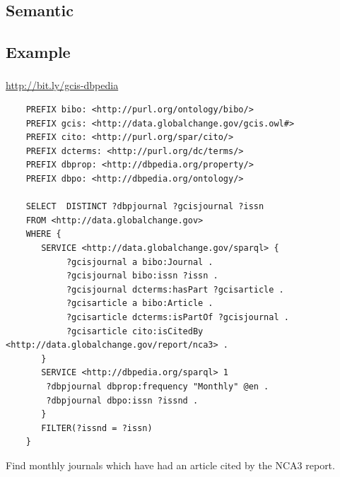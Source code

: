 \documentclass{beamer}
\begin{document}
\subsection{Semantic}

\subsection{Example}
\begin{frame}[fragile]
    \frametitle{\insertsubsectionhead}
     \url{http://bit.ly/gcis-dbpedia}\\
\begin{tiny}
\begin{Verbatim}
    PREFIX bibo: <http://purl.org/ontology/bibo/>
    PREFIX gcis: <http://data.globalchange.gov/gcis.owl#>
    PREFIX cito: <http://purl.org/spar/cito/>
    PREFIX dcterms: <http://purl.org/dc/terms/>
    PREFIX dbprop: <http://dbpedia.org/property/>
    PREFIX dbpo: <http://dbpedia.org/ontology/>

    SELECT  DISTINCT ?dbpjournal ?gcisjournal ?issn
    FROM <http://data.globalchange.gov>
    WHERE {
       SERVICE <http://data.globalchange.gov/sparql> {
            ?gcisjournal a bibo:Journal .
            ?gcisjournal bibo:issn ?issn .
            ?gcisjournal dcterms:hasPart ?gcisarticle .
            ?gcisarticle a bibo:Article .
            ?gcisarticle dcterms:isPartOf ?gcisjournal .
            ?gcisarticle cito:isCitedBy <http://data.globalchange.gov/report/nca3> .
       }
       SERVICE <http://dbpedia.org/sparql> 1
        ?dbpjournal dbprop:frequency "Monthly" @en .
        ?dbpjournal dbpo:issn ?issnd .
       }
       FILTER(?issnd = ?issn)
    }
\end{Verbatim}
\end{tiny}
    Find monthly journals which have had an article cited by the NCA3 report.

\end{frame}
\end{document}

